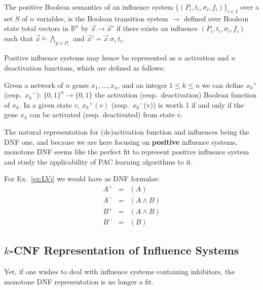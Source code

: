\documentclass{llncs}
\newcommand{\lra}{\longrightarrow}
\begin{document}
\begin{definition}
	The positive Boolean semantics of an influence system $\{(P_i, t_i, \sigma_i, f_i)\}_{i\in I}$
	over a set $S$ of $n$ variables,
	is the Boolean transition system $\lra$ defined over Boolean state total vectors in $\mathbb{B}^n$
	by
	${\vec x}\lra{\vec x'}$ if there exists an influence $(P_i, t_i, \sigma_i, f_i)$
	such that ${\vec x}\models \bigwedge_{p\in P_i}$
	and ${\vec x'} = {\vec x}\ \sigma_i\ t_i$.
\end{definition}

Positive influence systems may hence be represented as $n$ activation and $n$ deactivation functions, which are defined as follows:


\begin{definition}
	\label{def:activation}
	Given a network of $n$ genes $x_1,\ldots,x_n$, and
	an integer $1 \leq k \leq n$ we can define ${x_k}^+$ (resp.\ ${x_k}^-$):
	${\{0,1\}}^n \rightarrow\{0,1\}$ the activation (resp.\ deactivation)
	Boolean function of $x_k$. In a given state $v$, ${x_k}^+(v)$ (resp.\ ${x_k}^-$(v)) is worth 1 if and only if the gene $x_k$ can be activated (resp. deactivated) from state $v$.
\end{definition}

The natural representation for (de)activation function and influences being the DNF one, and because we are here focusing on \textbf{positive} influence systems, monotone DNF seems like the perfect fit to represent positive influence system and study the applicability of PAC learning algorithms to it.

\begin{example}

For Ex.~\ref{ex:LVi} we would have as DNF formulae:
\begin{eqnarray*}
   A^+&=&(A)\\
   A^-&=&(A \wedge B)\\
   B^+&=&(A\wedge B)\\
   B^-&=&(B)
\end{eqnarray*}

\end{example}

\subsection{$k$-CNF Representation of Influence Systems}

Yet, if one wishes to deal with influence systems containing inhibitors, the monotone DNF representation is no longer a fit.
\end{document}
